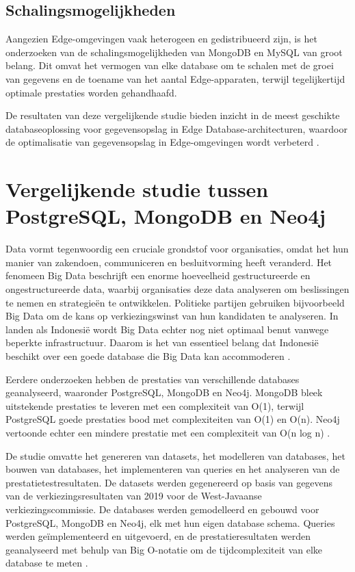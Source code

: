 \subsection{Schalingsmogelijkheden}

Aangezien Edge-omgevingen vaak heterogeen en gedistribueerd zijn, is het onderzoeken van de schalingsmogelijkheden van MongoDB en MySQL van groot belang. Dit omvat het vermogen van elke database om te schalen met de groei van gegevens en de toename van het aantal Edge-apparaten, terwijl tegelijkertijd optimale prestaties worden gehandhaafd.

De resultaten van deze vergelijkende studie bieden inzicht in de meest geschikte databaseoplossing voor gegevensopslag in Edge Database-architecturen, waardoor de optimalisatie van gegevensopslag in Edge-omgevingen wordt verbeterd \autocite{Gyorodi2015comparative}.

\section{Vergelijkende studie tussen PostgreSQL, MongoDB en Neo4j}

Data vormt tegenwoordig een cruciale grondstof voor organisaties, omdat het hun manier van zakendoen, communiceren en besluitvorming heeft veranderd. Het fenomeen Big Data beschrijft een enorme hoeveelheid gestructureerde en ongestructureerde data, waarbij organisaties deze data analyseren om beslissingen te nemen en strategieën te ontwikkelen. Politieke partijen gebruiken bijvoorbeeld Big Data om de kans op verkiezingswinst van hun kandidaten te analyseren. In landen als Indonesië wordt Big Data echter nog niet optimaal benut vanwege beperkte infrastructuur. Daarom is het van essentieel belang dat Indonesië beschikt over een goede database die Big Data kan accommoderen \autocite{Gyorodi2015comparative}.

Eerdere onderzoeken hebben de prestaties van verschillende databases geanalyseerd, waaronder PostgreSQL, MongoDB en Neo4j. MongoDB bleek uitstekende prestaties te leveren met een complexiteit van O(1), terwijl PostgreSQL goede prestaties bood met complexiteiten van O(1) en O(n). Neo4j vertoonde echter een mindere prestatie met een complexiteit van O(n log n) \autocite{Gyorodi2015comparative}.

De studie omvatte het genereren van datasets, het modelleren van databases, het bouwen van databases, het implementeren van queries en het analyseren van de prestatietestresultaten. De datasets werden gegenereerd op basis van gegevens van de verkiezingsresultaten van 2019 voor de West-Javaanse verkiezingscommissie. De databases werden gemodelleerd en gebouwd voor PostgreSQL, MongoDB en Neo4j, elk met hun eigen database schema. Queries werden geïmplementeerd en uitgevoerd, en de prestatieresultaten werden geanalyseerd met behulp van Big O-notatie om de tijdcomplexiteit van elke database te meten \autocite{Gyorodi2015comparative}.


